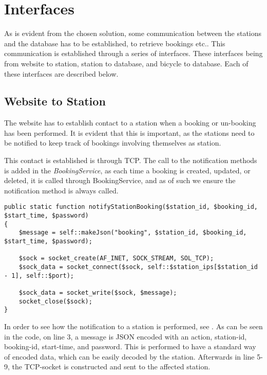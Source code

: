 \section{Interfaces}
As is evident from the chosen solution, some communication between the stations and the database has to be established, to retrieve bookings etc..
This communication is established through a series of interfaces.
These interfaces being from website to station, station to database, and bicycle to database.
Each of these interfaces are described below.

\subsection{Website to Station}\label{sec:webToStationI}
The website has to establish contact to a station when a booking or un-booking has been performed.
It is evident that this is important, as the stations need to be notified to keep track of bookings involving themselves as station.

This contact is established is through TCP.
The call to the notification methods is added in the \textit{BookingService}, as each time a booking is created, updated, or deleted, it is called through BookingService, and as of such we ensure the notification method is always called.

\begin{minipage}{\textwidth}
\begin{lstlisting}[caption = {Function for notifying a station of a new booking.}, label = {lst:notifystationbooking}]
public static function notifyStationBooking($station_id, $booking_id, $start_time, $password)
{
	$message = self::makeJson("booking", $station_id, $booking_id, $start_time, $password);
	
	$sock = socket_create(AF_INET, SOCK_STREAM, SOL_TCP);
	$sock_data = socket_connect($sock, self::$station_ips[$station_id - 1], self::$port);
	
	$sock_data = socket_write($sock, $message);
	socket_close($sock);
}
\end{lstlisting}
\end{minipage}

In order to see how the notification to a station is performed, see .
As can be seen in the code, on line 3, a message is JSON encoded with an action, station-id, booking-id, start-time, and password.
This is performed to have a standard way of encoded data, which can be easily decoded by the station.
Afterwards in line 5-9, the TCP-socket is constructed and sent to the affected station.

